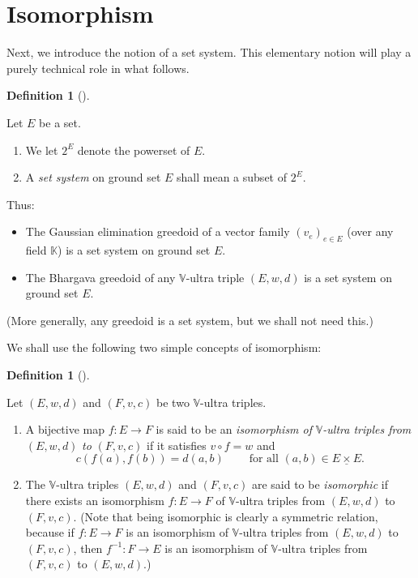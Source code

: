 \documentclass[numbers=enddot,12pt,final,onecolumn,notitlepage]{scrartcl}%
\theoremstyle{definition}
\newtheorem{defi}[theo]{Definition}
\newenvironment{definition}[1][]
{\begin{defi}[#1]\begin{leftbar}}
{\end{leftbar}\end{defi}}
\newcommand{\timesu}{\mathbin{\underline{\times}}}
\theoremstyle{plainsl}
\begin{document}
\section{Isomorphism}

Next, we introduce the notion of a set system. This elementary notion will
play a purely technical role in what follows.

\begin{definition}
\label{def.setsys}Let $E$ be a set.

\begin{enumerate}
\item[\textbf{(a)}] We let $2^{E}$ denote the powerset of $E$.

\item[\textbf{(b)}] A \textit{set system} on ground set $E$ shall mean a
subset of $2^{E}$.
\end{enumerate}
\end{definition}

Thus:

\begin{itemize}
\item The Gaussian elimination greedoid of a vector family $\left(
v_{e}\right)  _{e\in E}$ (over any field $\mathbb{K}$) is a set system on
ground set $E$.

\item The Bhargava greedoid of any $\mathbb{V}$-ultra triple $\left(
E,w,d\right)  $ is a set system on ground set $E$.
\end{itemize}

(More generally, any greedoid is a set system, but we shall not need this.)

We shall use the following two simple concepts of isomorphism:

\begin{definition}
Let $\left(  E,w,d\right)  $ and $\left(  F,v,c\right)  $ be two $\mathbb{V}%
$-ultra triples.

\begin{enumerate}
\item[\textbf{(a)}] A bijective map $f:E\rightarrow F$ is said to be an
\textit{isomorphism of }$\mathbb{V}$\textit{-ultra triples from }$\left(
E,w,d\right)  $ \textit{to }$\left(  F,v,c\right)  $ if it satisfies $v\circ
f=w$ and
\[
c\left(  f\left(  a\right)  ,f\left(  b\right)  \right)  =d\left(  a,b\right)
\ \ \ \ \ \ \ \ \ \ \text{for all }\left(  a,b\right)  \in E\timesu E.
\]


\item[\textbf{(b)}] The $\mathbb{V}$-ultra triples $\left(  E,w,d\right)  $
and $\left(  F,v,c\right)  $ are said to be \textit{isomorphic} if there
exists an isomorphism $f:E\rightarrow F$ of $\mathbb{V}$-ultra triples from
$\left(  E,w,d\right)  $ to $\left(  F,v,c\right)  $. (Note that being
isomorphic is clearly a symmetric relation, because if $f:E\rightarrow F$ is
an isomorphism of $\mathbb{V}$-ultra triples from $\left(  E,w,d\right)  $ to
$\left(  F,v,c\right)  $, then $f^{-1}:F\rightarrow E$ is an isomorphism of
$\mathbb{V}$-ultra triples from $\left(  F,v,c\right)  $ to $\left(
E,w,d\right)  $.)
\end{enumerate}
\end{definition}
\end{document}

